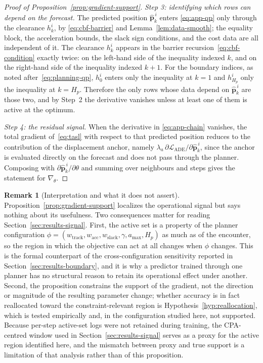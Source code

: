 \documentclass[11pt]{article}
\theoremstyle{plain}
\theoremstyle{definition}
\newtheorem{remark}{Remark}
\begin{document}
\begin{proof}[Proof of Proposition~\ref{prop:gradient-support}]
	\emph{Step 3: identifying which rows can depend on the forecast.}
	The predicted position $\hat{\bm{p}}^{\,i}_{k}$ enters
	\eqref{eq:app-qp} only through the clearance $h^{i}_{k}$, by
	\eqref{eq:cbf-barrier} and Lemma~\ref{lem:data-smooth}; the
	equality block, the acceleration bounds, the slack sign conditions,
	and the cost data are all independent of it. The clearance
	$h^{i}_{k}$ appears in the barrier
	recursion~\eqref{eq:cbf-condition} exactly twice: on the
	left-hand side of the inequality indexed $k$, and on the right-hand
	side of the inequality indexed $k+1$. For the boundary indices, as
	noted after~\eqref{eq:planning-qp}, $h^{i}_{0}$ enters only the
	inequality at $k=1$ and $h^{i}_{H_p}$ only the inequality at
	$k=H_p$. Therefore the only rows whose data depend on
	$\hat{\bm{p}}^{\,i}_{k}$ are those two, and by Step~2 the derivative
	vanishes unless at least one of them is active at the optimum.

	\emph{Step 4: the residual signal.} When the derivative in
	\eqref{eq:app-chain} vanishes, the total gradient of~\eqref{eq:tasl}
	with respect to that predicted position reduces to the contribution
	of the displacement anchor, namely
	$\lambda_a\,\partial\mathcal{L}_{\mathrm{ADE}}
		/\partial\hat{\bm{p}}^{\,i}_{k}$, since the anchor is evaluated
	directly on the forecast and does not pass through the planner.
	Composing with $\partial\hat{\bm{p}}^{\,i}_{k}/\partial\theta$ and
	summing over neighbours and steps gives the statement for
	$\nabla_\theta$.
\end{proof}

\begin{remark}[Interpretation and what it does not assert]
	\label{rem:support-scope}
	Proposition~\ref{prop:gradient-support} localizes the operational
	signal but says nothing about its usefulness. Two consequences
	matter for reading Section~\ref{sec:results-signal}. First, the
	active set is a property of the planner configuration
	$\phi=(w_{\mathrm{track}},w_{\mathrm{acc}},w_{\mathrm{slack}},
		\gamma,a_{\max},H_p)$ as much as of the encounter, so the region
	in which the objective can act at all changes when $\phi$ changes.
	This is the formal counterpart of the cross-configuration
	sensitivity reported in
	Section~\ref{sec:results-boundary}, and it is why a predictor
	trained through one planner has no structural reason to retain its
	operational effect under another. Second, the proposition constrains
	the support of the gradient, not the direction or magnitude of the
	resulting parameter change; whether accuracy is in fact reallocated
	toward the constraint-relevant region is
	Hypothesis~\ref{hyp:reallocation}, which is tested empirically and,
	in the configuration studied here, not supported. Because per-step
	active-set logs were not retained during training, the CPA-centred
	window used in
	Section~\ref{sec:results-signal} serves as a proxy for the active
	region identified here, and the mismatch between proxy and true
	support is a limitation of that analysis rather than of this
	proposition.
\end{remark}
\end{document}
